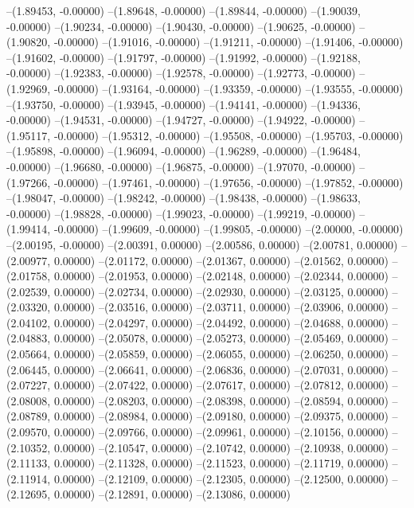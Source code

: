 --(1.89453, -0.00000)
--(1.89648, -0.00000)
--(1.89844, -0.00000)
--(1.90039, -0.00000)
--(1.90234, -0.00000)
--(1.90430, -0.00000)
--(1.90625, -0.00000)
--(1.90820, -0.00000)
--(1.91016, -0.00000)
--(1.91211, -0.00000)
--(1.91406, -0.00000)
--(1.91602, -0.00000)
--(1.91797, -0.00000)
--(1.91992, -0.00000)
--(1.92188, -0.00000)
--(1.92383, -0.00000)
--(1.92578, -0.00000)
--(1.92773, -0.00000)
--(1.92969, -0.00000)
--(1.93164, -0.00000)
--(1.93359, -0.00000)
--(1.93555, -0.00000)
--(1.93750, -0.00000)
--(1.93945, -0.00000)
--(1.94141, -0.00000)
--(1.94336, -0.00000)
--(1.94531, -0.00000)
--(1.94727, -0.00000)
--(1.94922, -0.00000)
--(1.95117, -0.00000)
--(1.95312, -0.00000)
--(1.95508, -0.00000)
--(1.95703, -0.00000)
--(1.95898, -0.00000)
--(1.96094, -0.00000)
--(1.96289, -0.00000)
--(1.96484, -0.00000)
--(1.96680, -0.00000)
--(1.96875, -0.00000)
--(1.97070, -0.00000)
--(1.97266, -0.00000)
--(1.97461, -0.00000)
--(1.97656, -0.00000)
--(1.97852, -0.00000)
--(1.98047, -0.00000)
--(1.98242, -0.00000)
--(1.98438, -0.00000)
--(1.98633, -0.00000)
--(1.98828, -0.00000)
--(1.99023, -0.00000)
--(1.99219, -0.00000)
--(1.99414, -0.00000)
--(1.99609, -0.00000)
--(1.99805, -0.00000)
--(2.00000, -0.00000)
--(2.00195, -0.00000)
--(2.00391, 0.00000)
--(2.00586, 0.00000)
--(2.00781, 0.00000)
--(2.00977, 0.00000)
--(2.01172, 0.00000)
--(2.01367, 0.00000)
--(2.01562, 0.00000)
--(2.01758, 0.00000)
--(2.01953, 0.00000)
--(2.02148, 0.00000)
--(2.02344, 0.00000)
--(2.02539, 0.00000)
--(2.02734, 0.00000)
--(2.02930, 0.00000)
--(2.03125, 0.00000)
--(2.03320, 0.00000)
--(2.03516, 0.00000)
--(2.03711, 0.00000)
--(2.03906, 0.00000)
--(2.04102, 0.00000)
--(2.04297, 0.00000)
--(2.04492, 0.00000)
--(2.04688, 0.00000)
--(2.04883, 0.00000)
--(2.05078, 0.00000)
--(2.05273, 0.00000)
--(2.05469, 0.00000)
--(2.05664, 0.00000)
--(2.05859, 0.00000)
--(2.06055, 0.00000)
--(2.06250, 0.00000)
--(2.06445, 0.00000)
--(2.06641, 0.00000)
--(2.06836, 0.00000)
--(2.07031, 0.00000)
--(2.07227, 0.00000)
--(2.07422, 0.00000)
--(2.07617, 0.00000)
--(2.07812, 0.00000)
--(2.08008, 0.00000)
--(2.08203, 0.00000)
--(2.08398, 0.00000)
--(2.08594, 0.00000)
--(2.08789, 0.00000)
--(2.08984, 0.00000)
--(2.09180, 0.00000)
--(2.09375, 0.00000)
--(2.09570, 0.00000)
--(2.09766, 0.00000)
--(2.09961, 0.00000)
--(2.10156, 0.00000)
--(2.10352, 0.00000)
--(2.10547, 0.00000)
--(2.10742, 0.00000)
--(2.10938, 0.00000)
--(2.11133, 0.00000)
--(2.11328, 0.00000)
--(2.11523, 0.00000)
--(2.11719, 0.00000)
--(2.11914, 0.00000)
--(2.12109, 0.00000)
--(2.12305, 0.00000)
--(2.12500, 0.00000)
--(2.12695, 0.00000)
--(2.12891, 0.00000)
--(2.13086, 0.00000)
